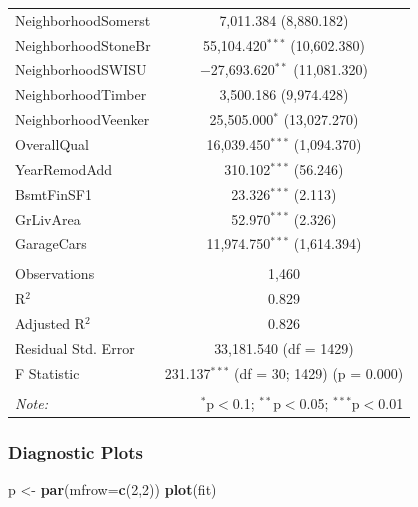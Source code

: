 \documentclass[]{article}
\newenvironment{Shaded}{\begin{snugshade}}{\end{snugshade}}
\newcommand{\KeywordTok}[1]{\textcolor[rgb]{0.13,0.29,0.53}{\textbf{{#1}}}}
\newcommand{\DataTypeTok}[1]{\textcolor[rgb]{0.13,0.29,0.53}{{#1}}}
\newcommand{\DecValTok}[1]{\textcolor[rgb]{0.00,0.00,0.81}{{#1}}}
\newcommand{\StringTok}[1]{\textcolor[rgb]{0.31,0.60,0.02}{{#1}}}
\newcommand{\NormalTok}[1]{{#1}}
\begin{document}
\begin{table}[!htbp]
\begin{tabular}{@{\extracolsep{5pt}}lc}
  NeighborhoodSomerst & 7,011.384 (8,880.182) \\ 
  NeighborhoodStoneBr & 55,104.420$^{***}$ (10,602.380) \\ 
  NeighborhoodSWISU & $-$27,693.620$^{**}$ (11,081.320) \\ 
  NeighborhoodTimber & 3,500.186 (9,974.428) \\ 
  NeighborhoodVeenker & 25,505.000$^{*}$ (13,027.270) \\ 
  OverallQual & 16,039.450$^{***}$ (1,094.370) \\ 
  YearRemodAdd & 310.102$^{***}$ (56.246) \\ 
  BsmtFinSF1 & 23.326$^{***}$ (2.113) \\ 
  GrLivArea & 52.970$^{***}$ (2.326) \\ 
  GarageCars & 11,974.750$^{***}$ (1,614.394) \\ 
 \hline \\[-1.8ex] 
Observations & 1,460 \\ 
R$^{2}$ & 0.829 \\ 
Adjusted R$^{2}$ & 0.826 \\ 
Residual Std. Error & 33,181.540 (df = 1429) \\ 
F Statistic & 231.137$^{***}$ (df = 30; 1429)  (p = 0.000) \\ 
\hline 
\hline \\[-1.8ex] 
\textit{Note:}  & \multicolumn{1}{r}{$^{*}$p$<$0.1; $^{**}$p$<$0.05; $^{***}$p$<$0.01} \\ 
\end{tabular} 
\end{table}

\newpage

\subsubsection{Diagnostic Plots}\label{diagnostic-plots}

\begin{Shaded}
\begin{Highlighting}[]
\NormalTok{p <-}\StringTok{ }\KeywordTok{par}\NormalTok{(}\DataTypeTok{mfrow=}\KeywordTok{c}\NormalTok{(}\DecValTok{2}\NormalTok{,}\DecValTok{2}\NormalTok{))}
\KeywordTok{plot}\NormalTok{(fit)}
\end{Highlighting}
\end{Shaded}
\end{document}
